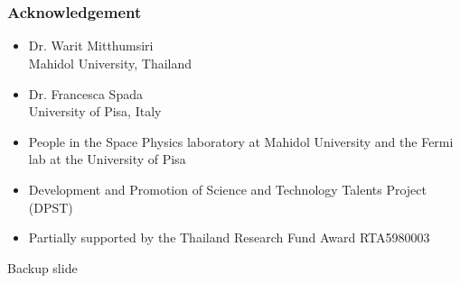 \documentclass{beamer}
\begin{document}
\section{}
\begin{frame}\frametitle{Acknowledgement}
  \begin{itemize}
    \item Dr. Warit Mitthumsiri \\ Mahidol University, Thailand
    \item Dr. Francesca Spada \\ University of Pisa, Italy
    \item People in the Space Physics laboratory at Mahidol University and the Fermi lab at the University of Pisa
    \item Development and Promotion of Science and Technology Talents Project (DPST)
    \item Partially supported by the Thailand Research Fund Award RTA5980003
  \end{itemize}
\end{frame}


\begin{frame}
\Huge{\centerline{Backup slide}}
\end{frame}
\end{document}
